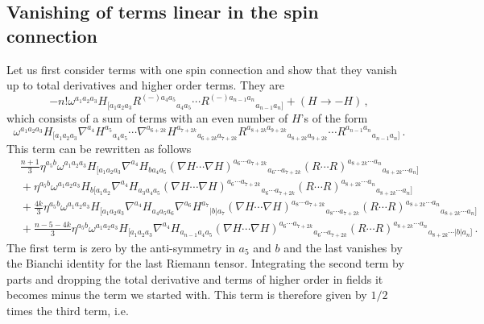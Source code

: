 \documentclass[a4paper,11pt]{article}
\begin{document}
\subsection{Vanishing of terms linear in the spin connection}
Let us first consider terms with one spin connection and show that they vanish up to total derivatives and higher order terms. They are
\begin{equation}
-n!\omega^{a_1a_2a_3}H_{[a_1a_2a_3}R^{(-)a_4a_5}{}_{a_4a_5}\cdots R^{(-)a_{n-1}a_n}{}_{a_{n-1}a_n]}
+(H\rightarrow-H)\,,
\end{equation}
which consists of a sum of terms with an even number of $H$'s of the form
\begin{equation}
\omega^{a_1a_2a_3}H_{[a_1a_2a_3}\nabla^{a_4}H^{a_5}{}_{a_4a_5}\cdots\nabla^{a_{6+2k}}H^{a_{7+2k}}{}_{a_{6+2k}a_{7+2k}}
R^{a_{8+2k}a_{9+2k}}{}_{a_{8+2k}a_{9+2k}}\cdots R^{a_{n-1}a_n}{}_{a_{n-1}a_n]}\,.
\end{equation}
This term can be rewritten as follows
\begin{equation}
\begin{aligned}
&\frac{n+1}{3}\eta^{a_5b}\omega^{a_1a_2a_3}H_{[a_1a_2a_3}\nabla^{a_4}H_{ba_4a_5}\left(\nabla H\cdots\nabla H\right)^{a_6\cdots a_{7+2k}}{}_{a_6\cdots a_{7+2k}}
\left(R\cdots R\right)^{a_{8+2k}\cdots a_n}{}_{a_{8+2k}\cdots a_n]}
\\
&{}
+\eta^{a_5b}\omega^{a_1a_2a_3}H_{b[a_1a_2}\nabla^{a_4}H_{a_3a_4a_5}
\left(\nabla H\cdots\nabla H\right)^{a_6\cdots a_{7+2k}}{}_{a_6\cdots a_{7+2k}}
\left(R\cdots R\right)^{a_{8+2k}\cdots a_n}{}_{a_{8+2k}\cdots a_n]}
\\
&{}
+\frac{4k}{3}\eta^{a_5b}\omega^{a_1a_2a_3}H_{[a_1a_2a_3}\nabla^{a_4}H_{a_4a_5a_6}\nabla^{a_6}H^{a_7}{}_{|b|a_7}
\left(\nabla H\cdots\nabla H\right)^{a_8\cdots a_{7+2k}}{}_{a_8\cdots a_{7+2k}}
\left(R\cdots R\right)^{a_{8+2k}\cdots a_n}{}_{a_{8+2k}\cdots a_n]}
\\
&{}
+\frac{n-5-4k}{3}\eta^{a_5b}\omega^{a_1a_2a_3}H_{[a_1a_2a_3}\nabla^{a_4}H_{a_{n-1}a_4a_5}
\left(\nabla H\cdots\nabla H\right)^{a_6\cdots a_{7+2k}}{}_{a_6\cdots a_{7+2k}}
\left(R\cdots R\right)^{a_{8+2k}\cdots a_n}{}_{a_{8+2k}\cdots|b|a_n]}\,.
\end{aligned}
\end{equation}
The first term is zero by the anti-symmetry in $a_5$ and $b$ and the last vanishes by the Bianchi identity for the last Riemann tensor. Integrating the second term by parts and dropping the total derivative and terms of higher order in fields it becomes minus the term we started with. This term is therefore given by $1/2$ times the third term, i.e.
\end{document}
